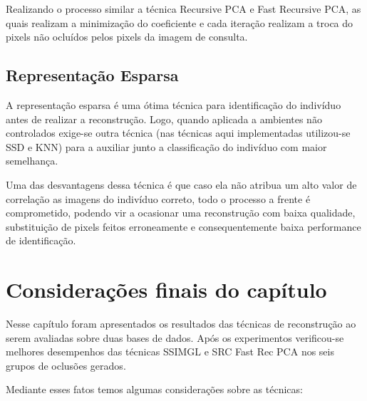 Realizando o processo similar a técnica Recursive PCA e Fast Recursive PCA, as quais realizam a minimização do coeficiente e cada iteração realizam a troca do pixels não ocluídos pelos pixels da imagem de consulta.


\subsection{Representação Esparsa}

A representação esparsa é uma ótima técnica para identificação do indivíduo antes de realizar a reconstrução. Logo, quando aplicada a ambientes não controlados exige-se outra técnica (nas técnicas aqui implementadas utilizou-se SSD e KNN) para a auxiliar junto a classificação do indivíduo com maior semelhança.

Uma das desvantagens dessa técnica é que caso ela não atribua um alto valor de correlação as imagens do indivíduo correto, todo o processo a frente é comprometido, podendo vir a ocasionar uma reconstrução com baixa qualidade, substituição de pixels feitos erroneamente e consequentemente baixa performance de identificação.


\section{Considerações finais do capítulo}
Nesse capítulo foram apresentados os resultados das técnicas de reconstrução ao serem avaliadas sobre duas bases de dados. Após os experimentos verificou-se melhores desempenhos das técnicas SSIMGL e SRC Fast Rec PCA nos seis grupos de oclusões gerados.

Mediante esses fatos temos algumas considerações sobre as técnicas:


